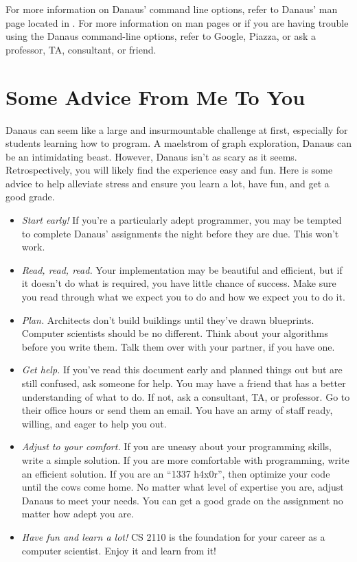 \documentclass{pset}
\begin{document}
For more information on Danaus' command line options, refer to Danaus' man page
located in . For more information on man pages or if you are
having trouble using the Danaus command-line options, refer to Google, Piazza,
or ask a professor, TA, consultant, or friend.
\fi

\ifx \ADVICE \undefined \else
\section{Some Advice From Me To You}
Danaus can seem like a large and insurmountable challenge at first, especially
for students learning how to program. A maelstrom of graph exploration, Danaus
can be an intimidating beast. However, Danaus isn't as scary as it seems.
Retrospectively, you will likely find the experience easy and fun. Here is some
advice to help alleviate stress and ensure you learn a lot, have fun, and get a
good grade.
\begin{itemize}
    \item \emph{Start early!} If you're a particularly adept programmer, you
        may be tempted to complete Danaus' assignments the night before they
        are due. This won't work.
    \item \emph{Read, read, read.} Your implementation may be beautiful and
        efficient, but if it doesn't do what is required, you have little
        chance of success. Make sure you read through what we expect you to do
        and how we expect you to do it.
    \item \emph{Plan.} Architects don't build buildings until they've drawn
        blueprints. Computer scientists should be no different. Think about
        your algorithms before you write them. Talk them over with your
        partner, if you have one.
    \item \emph{Get help.} If you've read this document early and planned
        things out but are still confused, ask someone for help. You may have a
        friend that has a better understanding of what to do. If not, ask a
        consultant, TA, or professor. Go to their office hours or send them an
        email. You have an army of staff ready, willing, and eager to help you
        out.
    \item \emph{Adjust to your comfort.} If you are uneasy about your
        programming skills, write a simple solution. If you are more
        comfortable with programming, write an efficient solution. If you are
        an ``1337 h4x0r'', then optimize your code until  the cows come home.
        No matter what level of expertise you are, adjust Danaus to meet your
        needs. You can get a good grade on the assignment no matter how adept
        you are.  
    \item \emph{Have fun and learn a lot!} CS 2110 is the foundation for your
        career as a computer scientist. Enjoy it and learn from it! 
\end{itemize}
\fi
\end{document}
